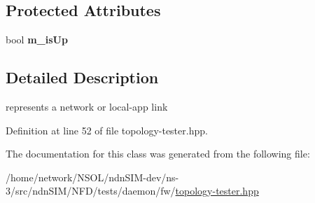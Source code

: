 \subsection*{Protected Attributes}
\begin{DoxyCompactItemize}
\item 
bool {\bfseries m\+\_\+is\+Up}\hypertarget{classnfd_1_1fw_1_1tests_1_1TopologyLinkBase_ade8e406f9eccb7fb2425210f1fa423ca}{}\label{classnfd_1_1fw_1_1tests_1_1TopologyLinkBase_ade8e406f9eccb7fb2425210f1fa423ca}

\end{DoxyCompactItemize}


\subsection{Detailed Description}
represents a network or local-\/app link 

Definition at line 52 of file topology-\/tester.\+hpp.



The documentation for this class was generated from the following file\+:\begin{DoxyCompactItemize}
\item 
/home/network/\+N\+S\+O\+L/ndn\+S\+I\+M-\/dev/ns-\/3/src/ndn\+S\+I\+M/\+N\+F\+D/tests/daemon/fw/\hyperlink{topology-tester_8hpp}{topology-\/tester.\+hpp}\end{DoxyCompactItemize}
